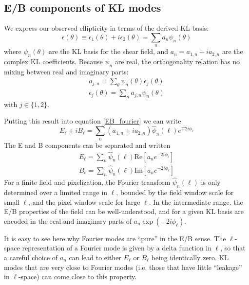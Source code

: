 \documentclass[12pt]{article}			%
\begin{document}
\subsection{E/B components of KL modes}
We express our observed ellipticity in terms of the derived KL basis:
\begin{equation}
  \epsilon(\theta) \equiv \epsilon_1(\theta) + i\epsilon_2(\theta) 
  = \sum_n a_n\psi_n(\theta)
\end{equation}
where $\psi_n(\theta)$ are the KL basis for the shear field, and
$a_n = a_{1,n} + ia_{2,n}$ are the complex KL coefficients.  Because
$\psi_n$ are real, the orthogonality relation has no mixing between real
and imaginary parts:
\begin{eqnarray}
  a_{j,n} = \sum_\theta \psi_n(\theta)\epsilon_j(\theta) \nonumber\\
  \epsilon_j(\theta) = \sum_n a_{j,n}\psi_n(\theta)
\end{eqnarray}
with $j\in\{1,2\}$.

Putting this result into equation \ref{EB_fourier} we can write
\begin{equation}
  E_\ell \pm iB_\ell = \sum_n (a_{1,n} \pm ia_{2,n})\hat\psi_n(\ell) e^{\mp 2i\phi_\ell}
\end{equation}
The E and B components can be separated and written
\begin{eqnarray}
  E_\ell = \sum_n\hat\psi_n(\ell)
  \mathrm{Re}\left[ a_n e^{-2i\phi_\ell} \right] \nonumber\\
  B_\ell = \sum_n\hat\psi_n(\ell)
  \mathrm{Im}\left[ a_n e^{-2i\phi_\ell} \right] 
\end{eqnarray}
For a finite field and pixelization, the Fourier transform $\hat\psi_n(\ell)$
is only determined over a limited range in $\ell$, 
bounded by the field window scale for small $\ell$, 
and the pixel window scale for large $\ell$.  
In the intermediate range, the E/B properties of the field 
can be well-understood, and for a given KL basis
are encoded in the real and imaginary
parts of $a_n \exp(-2i\phi_\ell)$.

It is easy to see here why Fourier modes are ``pure'' in the E/B sense.
The $\ell$-space representation of a Fourier mode is 
given by a delta function in $\ell$, so that
a careful choice of $a_n$ can lead to either $E_\ell$ or $B_\ell$ being
identically zero.  KL modes that are very close to Fourier modes (i.e. those
that have little ``leakage'' in $\ell$-space) can come close to this property.
\end{document}
